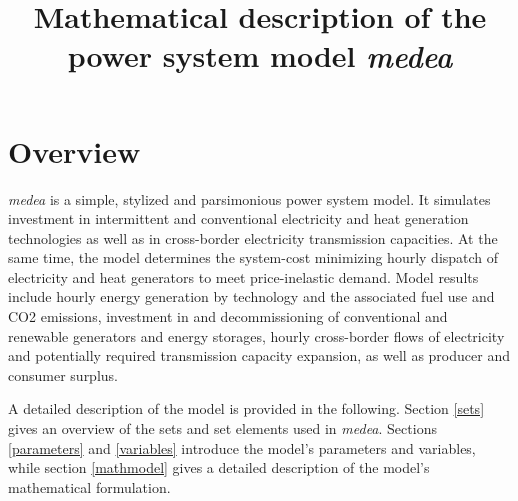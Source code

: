 \documentclass[11pt,a4paper]{article}
\begin{document}
\title{Mathematical description of the power system model \emph{medea}}
\section{Overview}
\emph{medea} is a simple, stylized and parsimonious power system model.
It simulates investment in intermittent and conventional electricity and heat generation technologies as well as in cross-border electricity transmission capacities.
At the same time, the model determines the system-cost minimizing hourly dispatch of electricity and heat generators to meet price-inelastic demand.
Model results include hourly energy generation by technology and the associated fuel use and CO2 emissions, investment in and decommissioning of conventional and renewable generators and energy storages, hourly cross-border flows of electricity and potentially required transmission capacity expansion, as well as producer and consumer surplus.

A detailed description of the model is provided in the following. Section \ref{sets} gives an overview of the sets and set elements used in \emph{medea}. Sections \ref{parameters} and \ref{variables} introduce the model's parameters and variables, while section \ref{mathmodel} gives a detailed description of the model's mathematical formulation.
\end{document}
